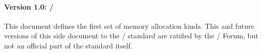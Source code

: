 \paragraph{Version 1.0: \MEMALLOCDATE/} This document defines
the first set of memory allocation kinds. This and future
versions of this side document to the \MPI/ standard are
ratified by the \MPI/ Forum, but not an official part of the
standard itself.
